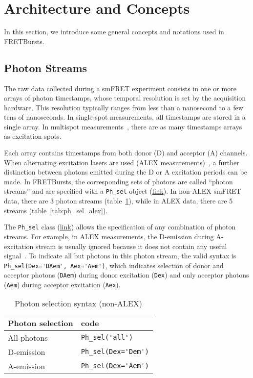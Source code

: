 \section{Architecture and Concepts}
\label{sec:concepts}

In this section, we introduce some general concepts and notations used in FRETBursts.

\subsection{Photon Streams}
\label{sec:ph_streams}

The raw data collected during a smFRET experiment consists in one or more arrays of photon timestamps, whose temporal resolution is set by the acquisition hardware. This resolution typically ranges from less than a nanosecond to a few tens of nanoseconds.
In single-spot measurements, all timestamps are stored in a single array. In multispot
measurements~\cite{Ingargiola_2013}, there are as many timestamps arrays
as excitation spots.

Each array contains timestamps from both donor (D) and acceptor (A) channels.
When alternating excitation lasers are used (ALEX measurements)~\cite{Lee_2005}, a further distinction between
photons emitted during the D or A excitation periods can be made. In FRETBursts, the corresponding
sets of photons are called ``photon streams'' and are
specified with a \verb|Ph_sel| object
(\href{http://fretbursts.readthedocs.org/en/latest/ph_sel.html}{link}).
In non-ALEX smFRET data, there are 3 photon streams
(table~\ref{tab:ph_sel_smfret}), while in ALEX data, there are 5 streams (table~\ref{tab:ph_sel_alex}).

The \verb|Ph_sel| class (\href{http://fretbursts.readthedocs.org/en/latest/ph_sel.html}{link})
allows the specification of any combination of photon streams.
For example, in ALEX measurements, the D-emission during A-excitation stream is
usually ignored because it does not contain any useful signal~\cite{Lee_2005}.
To indicate all but photons in this photon stream, the valid syntax is
\verb|Ph_sel(Dex='DAem', Aex='Aem')|, which indicates selection of donor
and acceptor photons (\verb|DAem|) during donor excitation (\verb|Dex|) and only acceptor
photons (\verb|Aem|) during acceptor excitation (\verb|Aex|).

\begin{table}
\begin{tabular}{l|l}
  Photon selection  & code \\
  \hline
  All-photons       & \verb|Ph_sel('all')|\\
  D-emission    & \verb|Ph_sel(Dex='Dem')|\\
  A-emission & \verb|Ph_sel(Dex='Aem')|\\
\end{tabular}
\caption{\label{tab:ph_sel_smfret}Photon selection syntax (non-ALEX)}
\end{table}

